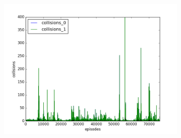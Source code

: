 \begin{figure}[t]
\begin{subfigure}[t]{\figscale\linewidth}
    \includegraphics[width=1.5\textwidth]
    {../results/maddpg_1vs1/collisions.png}
    \label{fig:maddpg-1vs1-collisions}
  \end{subfigure}


\end{figure}
